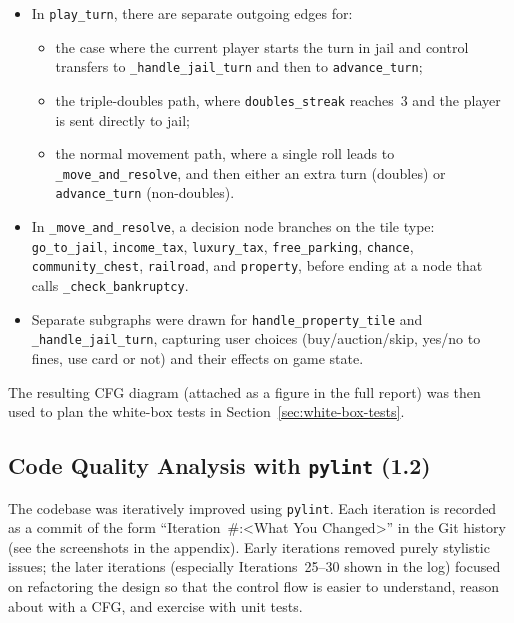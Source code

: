\documentclass[11pt]{article}
\begin{document}
\begin{itemize}
  \item In \texttt{play\_turn}, there are separate outgoing edges for:
  \begin{itemize}
    \item the case where the current player starts the turn in jail and control transfers to \texttt{\_handle\_jail\_turn} and then to \texttt{advance\_turn};
    \item the triple-doubles path, where \texttt{doubles\_streak} reaches~3 and the player is sent directly to jail;
    \item the normal movement path, where a single roll leads to \texttt{\_move\_and\_resolve}, and then either an extra turn (doubles) or \texttt{advance\_turn} (non-doubles).
  
\end{itemize}
  \item In \texttt{\_move\_and\_resolve}, a decision node branches on the tile type: \texttt{go\_to\_jail}, \texttt{income\_tax}, \texttt{luxury\_tax}, \texttt{free\_parking}, \texttt{chance}, \texttt{community\_chest}, \texttt{railroad}, and \texttt{property}, before ending at a node that calls \texttt{\_check\_bankruptcy}.
  \item Separate subgraphs were drawn for \texttt{handle\_property\_tile} and \texttt{\_handle\_jail\_turn}, capturing user choices (buy/auction/skip, yes/no to fines, use card or not) and their effects on game state.

\end{itemize}

The resulting CFG diagram (attached as a figure in the full report) was then used to plan the white-box tests in Section~\ref{sec:white-box-tests}.

\subsection{Code Quality Analysis with \texttt{pylint} (1.2)}

\label{sec:code-quality}

The codebase was iteratively improved using \texttt{pylint}. Each iteration is recorded as a commit of the form ``Iteration~\#:\textless{}What You Changed\textgreater{}'' in the Git history (see the screenshots in the appendix). Early iterations removed purely stylistic issues; the later iterations (especially Iterations~25--30 shown in the log) focused on refactoring the design so that the control flow is easier to understand, reason about with a CFG, and exercise with unit tests.
\end{document}
